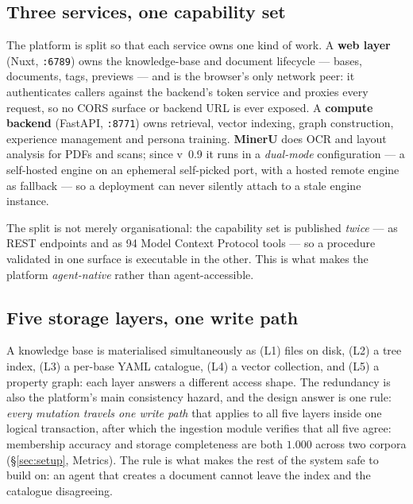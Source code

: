 \documentclass[sigconf, review, anonymous]{acmart}
\begin{document}


\subsection{Three services, one capability set}\label{sec:sys-services}
The platform is split so that each service owns one kind of work.
A \textbf{web layer} (Nuxt, \texttt{:6789}) owns the knowledge-base and document
lifecycle --- bases, documents, tags, previews --- and is the browser's only
network peer: it authenticates callers against the backend's token service and
proxies every request, so no CORS surface or backend URL is ever exposed.
A \textbf{compute backend} (FastAPI, \texttt{:8771}) owns retrieval, vector
indexing, graph construction, experience management and persona training.
\textbf{MinerU} does OCR and layout analysis for PDFs and scans; since
v~0.9 it runs in a \emph{dual-mode} configuration --- a self-hosted engine on
an ephemeral self-picked port, with a hosted remote engine as fallback --- so a
deployment can never silently attach to a stale engine instance.

The split is not merely organisational: the capability set is published
\emph{twice} --- as REST endpoints and as 94 Model Context Protocol tools ---
so a procedure validated in one surface is executable in the other. This is
what makes the platform \emph{agent-native} rather than agent-accessible.

\subsection{Five storage layers, one write path}\label{sec:sys-layers}
A knowledge base is materialised simultaneously as (L1) files on disk, (L2) a tree
index, (L3) a per-base YAML catalogue, (L4) a vector collection, and (L5) a
property graph: each layer answers a different access shape. The redundancy is
also the platform's main consistency hazard, and the design answer is one rule:
\emph{every mutation travels one write path} that applies to all five layers
inside one logical transaction, after which the ingestion module verifies that
all five agree: membership accuracy and storage completeness are both $1.000$
across two corpora (\S\ref{sec:setup}, Metrics). The rule is
what makes the rest of the system safe to build on: an agent that creates a
document cannot leave the index and the catalogue disagreeing.
\end{document}
